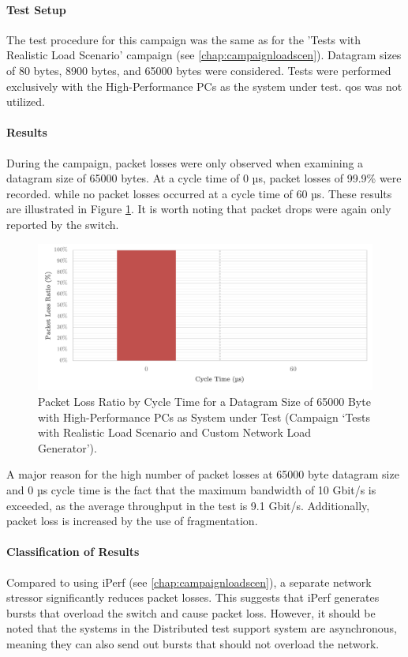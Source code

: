 \paragraph{Test Setup}
The test procedure for this campaign was the same as for the 'Tests with Realistic Load Scenario' campaign (see \ref{chap:campaignloadscen}). Datagram sizes of 80 bytes, 8900 bytes, and 65000 bytes were considered. Tests were performed exclusively with the High-Performance PCs as the system under test. \ac{qos} was not utilized.

\paragraph{Results}

During the campaign, packet losses were only observed when examining a datagram size of 65000 bytes. At a cycle time of 0 µs, packet losses of 99.9\% were recorded. while no packet losses occurred at a cycle time of 60 µs. These results are illustrated in Figure \ref{fig:srpr5}. It is worth noting that packet drops were again only reported by the switch.

\begin{figure}[h!]
    \centering
    \includegraphics[width=1\linewidth]{figures/reliability/star/rel_d_5.pdf}
    \caption{Packet Loss Ratio by Cycle Time for a Datagram Size of 65000 Byte with High-Performance PCs as System under Test (Campaign `Tests with Realistic Load Scenario and Custom Network Load Generator').}    \label{fig:srpr5}
\end{figure}

A major reason for the high number of packet losses at 65000 byte datagram size and 0 µs cycle time is the fact that the maximum bandwidth of 10 Gbit/s is exceeded, as the average throughput in the test is 9.1 Gbit/s. Additionally, packet loss is increased by the use of fragmentation.

\paragraph{Classification of Results}
Compared to using iPerf (see \ref{chap:campaignloadscen}), a separate network stressor significantly reduces packet losses. This suggests that iPerf generates bursts that overload the switch and cause packet loss. However, it should be noted that the systems in the Distributed test support system are asynchronous, meaning they can also send out bursts that should not overload the network.


